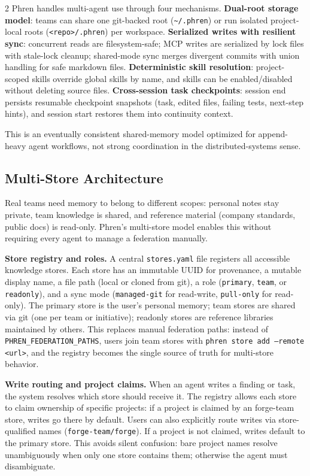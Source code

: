 \documentclass[10pt]{article}
\begin{document}
\begin{multicols}{2}
Phren handles multi-agent use through four mechanisms. \textbf{Dual-root storage model}: teams can share one git-backed root (\texttt{\textasciitilde/.phren}) or run isolated project-local roots (\texttt{<repo>/.phren}) per workspace. \textbf{Serialized writes with resilient sync}: concurrent reads are filesystem-safe; MCP writes are serialized by lock files with stale-lock cleanup; shared-mode sync merges divergent commits with union handling for safe markdown files. \textbf{Deterministic skill resolution}: project-scoped skills override global skills by name, and skills can be enabled/disabled without deleting source files. \textbf{Cross-session task checkpoints}: session end persists resumable checkpoint snapshots (task, edited files, failing tests, next-step hints), and session start restores them into continuity context.

This is an eventually consistent shared-memory model optimized for append-heavy agent workflows, not strong coordination in the distributed-systems sense.

\subsection{Multi-Store Architecture}

Real teams need memory to belong to different scopes: personal notes stay private, team knowledge is shared, and reference material (company standards, public docs) is read-only. Phren's multi-store model enables this without requiring every agent to manage a federation manually.

\textbf{Store registry and roles.} A central \texttt{stores.yaml} file registers all accessible knowledge stores. Each store has an immutable UUID for provenance, a mutable display name, a file path (local or cloned from git), a role (\texttt{primary}, \texttt{team}, or \texttt{readonly}), and a sync mode (\texttt{managed-git} for read-write, \texttt{pull-only} for read-only). The primary store is the user's personal memory; team stores are shared via git (one per team or initiative); readonly stores are reference libraries maintained by others. This replaces manual federation paths: instead of \texttt{PHREN\_FEDERATION\_PATHS}, users join team stores with \texttt{phren store add --remote <url>}, and the registry becomes the single source of truth for multi-store behavior.

\textbf{Write routing and project claims.} When an agent writes a finding or task, the system resolves which store should receive it. The registry allows each store to claim ownership of specific projects: if a project is claimed by an forge-team store, writes go there by default. Users can also explicitly route writes via store-qualified names (\texttt{forge-team/forge}). If a project is not claimed, writes default to the primary store. This avoids silent confusion: bare project names resolve unambiguously when only one store contains them; otherwise the agent must disambiguate.


\end{multicols}
\end{document}

